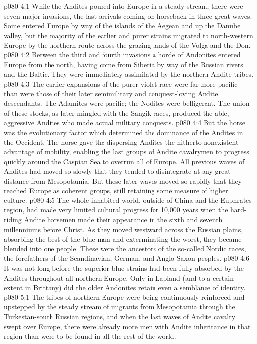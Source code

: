 \vs p080 4:1 While the Andites poured into Europe in a steady stream, there were seven major invasions, the last arrivals coming on horseback in three great waves. Some entered Europe by way of the islands of the Aegean and up the Danube valley, but the majority of the earlier and purer strains migrated to north\hyp{}western Europe by the northern route across the grazing lands of the Volga and the Don.
\vs p080 4:2 Between the third and fourth invasions a horde of Andonites entered Europe from the north, having come from Siberia by way of the Russian rivers and the Baltic. They were immediately assimilated by the northern Andite tribes.
\vs p080 4:3 The earlier expansions of the purer violet race were far more pacific than were those of their later semimilitary and conquest\hyp{}loving Andite descendants. The Adamites were pacific; the Nodites were belligerent. The union of these stocks, as later mingled with the Sangik races, produced the able, aggressive Andites who made actual military conquests.
\vs p080 4:4 \pc But the horse was the evolutionary factor which determined the dominance of the Andites in the Occident. The horse gave the dispersing Andites the hitherto nonexistent advantage of mobility, enabling the last groups of Andite cavalrymen to progress quickly around the Caspian Sea to overrun all of Europe. All previous waves of Andites had moved so slowly that they tended to disintegrate at any great distance from Mesopotamia. But these later waves moved so rapidly that they reached Europe as coherent groups, still retaining some measure of higher culture.
\vs p080 4:5 The whole inhabited world, outside of China and the Euphrates region, had made very limited cultural progress for 10,000 years when the hard\hyp{}riding Andite horsemen made their appearance in the sixth and seventh millenniums before Christ. As they moved westward across the Russian plains, absorbing the best of the blue man and exterminating the worst, they became blended into one people. These were the ancestors of the so\hyp{}called Nordic races, the forefathers of the Scandinavian, German, and Anglo\hyp{}Saxon peoples.
\vs p080 4:6 \pc It was not long before the superior blue strains had been fully absorbed by the Andites throughout all northern Europe. Only in Lapland (and to a certain extent in Brittany) did the older Andonites retain even a semblance of identity.
\vs p080 5:1 The tribes of northern Europe were being continuously reinforced and upstepped by the steady stream of migrants from Mesopotamia through the Turkestan\hyp{}south Russian regions, and when the last waves of Andite cavalry swept over Europe, there were already more men with Andite inheritance in that region than were to be found in all the rest of the world.
